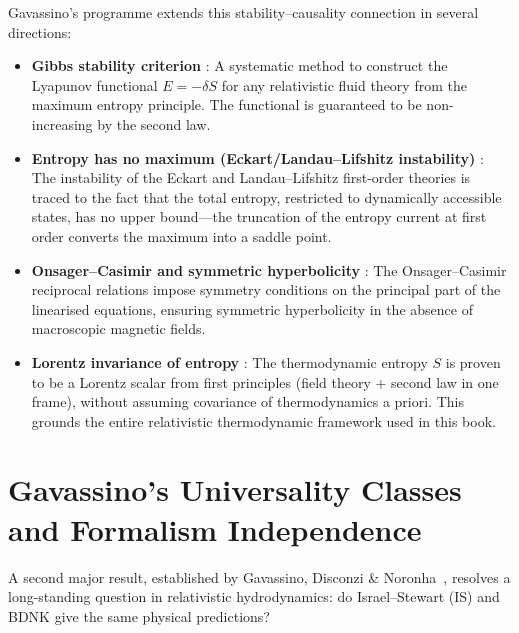 Gavassino's programme extends this stability--causality connection in
several directions:
\begin{itemize}
  \item \textbf{Gibbs stability criterion}
    \citep{GavassinoGibbs2021}: A systematic method to construct the
    Lyapunov functional $E = -\delta S$ for any relativistic fluid
    theory from the maximum entropy principle.  The functional is
    guaranteed to be non-increasing by the second law.

  \item \textbf{Entropy has no maximum (Eckart/Landau--Lifshitz
    instability)} \citep{GavassinoLyapunov2020}: The instability of
    the Eckart and Landau--Lifshitz first-order theories is traced to
    the fact that the total entropy, restricted to dynamically
    accessible states, has no upper bound---the truncation of the
    entropy current at first order converts the maximum into a saddle
    point.

  \item \textbf{Onsager--Casimir and symmetric hyperbolicity}
    \citep{GavassinoCasimir2022}: The Onsager--Casimir reciprocal
    relations impose symmetry conditions on the principal part of the
    linearised equations, ensuring symmetric hyperbolicity in the
    absence of macroscopic magnetic fields.

  \item \textbf{Lorentz invariance of entropy}
    \citep{GavassinoLorentz2021}: The thermodynamic entropy $S$ is
    proven to be a Lorentz scalar from first principles (field theory
    + second law in one frame), without assuming covariance of
    thermodynamics a priori.  This grounds the entire relativistic
    thermodynamic framework used in this book.
\end{itemize}


\section{Gavassino's Universality Classes and Formalism Independence}
\label{sec:gavassino-universality}

A second major result, established by Gavassino, Disconzi \&
Noronha~\citep{GavassinoUniversality1,GavassinoUniversality2},
resolves a long-standing question in relativistic hydrodynamics: do
Israel--Stewart (IS) and BDNK give the same physical predictions?

